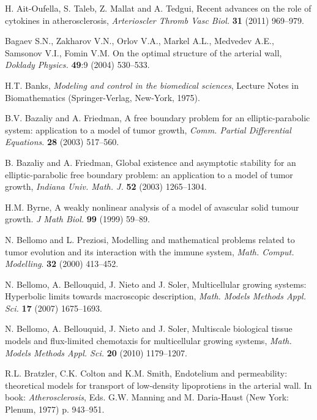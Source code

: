 \documentclass[reqno]{amsart}            %
\numberwithin{equation}{section}
\begin{document}
\begin{thebibliography}{99}

H. Ait-Oufella, S. Taleb, Z. Mallat and A. Tedgui,
Recent advances on the role of cytokines in atherosclerosis, {\it Arterioscler Thromb Vasc Biol.} {\bf 31} (2011) 969--979.

Bagaev S.N., Zakharov V.N., Orlov V.A., Markel A.L., Medvedev A.E., Samsonov V.I., Fomin V.M.
On the optimal structure of the arterial wall, {\it Doklady Physics.} {\bf 49}:9 (2004)  530--533.


H.T. Banks, {\it Modeling and control in the biomedical sciences}, Lecture Notes in Biomathematics (Springer-Verlag, New-York, 1975).

 B.V. Bazaliy and A. Friedman, A free boundary problem for an elliptic-parabolic system: application to a model of tumor growth, {\it Comm. Partial Differential Equations}. {\bf 28} (2003) 517--560.

 B. Bazaliy and A. Friedman, Global existence and asymptotic stability for an elliptic-parabolic free boundary problem: an application to a model of tumor growth, {\it Indiana Univ. Math. J.} {\bf 52} (2003) 1265--1304.

H.M. Byrne,   A weakly nonlinear analysis of a model of avascular solid
tumour growth. {\it J Math Biol.} {\bf 99} (1999)  59--89.

N. Bellomo and L. Preziosi, Modelling and mathematical problems related to tumor evolution and its interaction with the immune system, {\it Math. Comput. Modelling}. {\bf 32} (2000) 413--452.

N. Bellomo, A. Bellouquid, J. Nieto and J. Soler, Multicellular growing systems: Hyperbolic
limits towards macroscopic description, {\it Math. Models Methods Appl. Sci.} {\bf 17} (2007)
1675--1693.

N. Bellomo, A. Bellouquid, J. Nieto and J. Soler, Multiscale biological tissue models
and flux-limited chemotaxis for multicellular growing systems, {\it Math. Models Methods
Appl. Sci.} \textbf{20} (2010) 1179--1207.

R.L. Bratzler, C.K. Colton and K.M. Smith, Endotelium and permeability: theoretical models for transport of low-density lipoprotiens in the arterial wall. In book: {\it Atherosclerosis}, Eds. G.W. Manning and M. Daria-Haust (New York: Plenum, 1977) p. 943--951.


\end{thebibliography}
\end{document}
